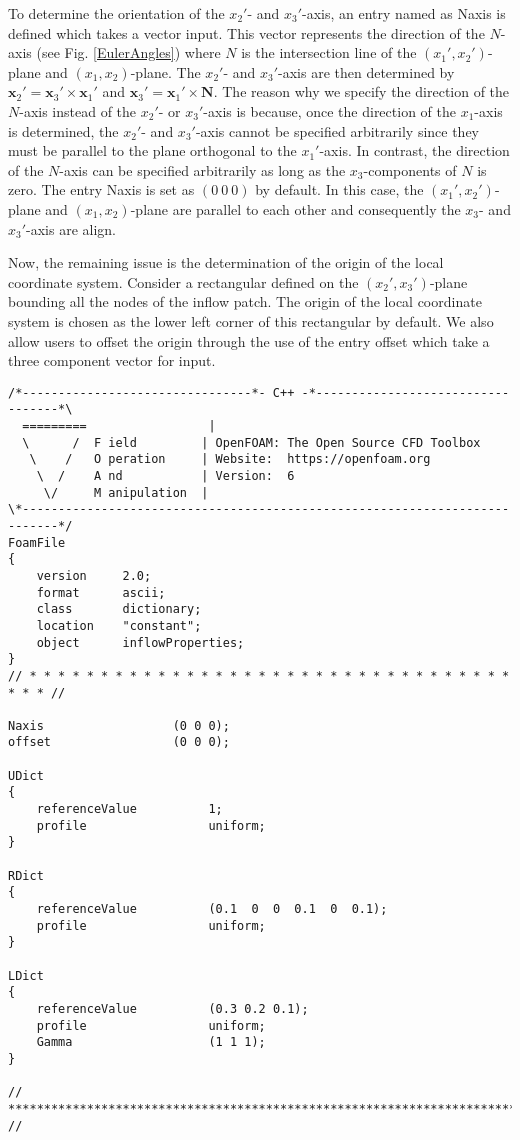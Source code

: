 To determine the orientation of the $x_2'$- and $x_3'$-axis, an entry named as \textcolor{mauve}{Naxis} is defined which takes a vector input. This vector represents the direction of the $N$-axis (see Fig. \ref{EulerAngles}) where $N$ is the intersection line of the $(x_1',x_2')$-plane and $(x_1,x_2)$-plane. The $x_2'$- and $x_3'$-axis are then determined by $\boldsymbol{x}_2' = \boldsymbol{x}_3'\times\boldsymbol{x}_1'$ and $\boldsymbol{x}_3' = \boldsymbol{x}_1'\times\boldsymbol{N}$. The reason why we specify the direction of the $N$-axis instead of the $x_2'$- or $x_3'$-axis is because, once the direction of the $x_1$-axis is determined, the $x_2'$- and $x_3'$-axis cannot be specified arbitrarily since they must be parallel to the plane orthogonal to the $x_1'$-axis. In contrast, the direction of the $N$-axis can be specified arbitrarily as long as the $x_3$-components of $N$ is zero. The entry \textcolor{mauve}{Naxis} is set as $(0 \ 0 \ 0)$ by default. In this case, the $(x_1',x_2')$-plane and $(x_1,x_2)$-plane are parallel to each other and consequently the $x_3$- and $x_3'$-axis are align.

Now, the remaining issue is the determination of the origin of the local coordinate system. Consider a rectangular defined on the $(x_2',x_3')$-plane bounding all the nodes of the inflow patch. The origin of the local coordinate system is chosen as the lower left corner of this rectangular by default. We also allow users to offset the origin through the use of the entry \textcolor{mauve}{offset} which take a three component vector for input. 

\begin{lstlisting}
/*--------------------------------*- C++ -*----------------------------------*\
  =========                 |
  \      /  F ield         | OpenFOAM: The Open Source CFD Toolbox
   \    /   O peration     | Website:  https://openfoam.org
    \  /    A nd           | Version:  6
     \/     M anipulation  |
\*---------------------------------------------------------------------------*/
FoamFile
{
    version     2.0;
    format      ascii;
    class       dictionary;
    location    "constant";
    object      inflowProperties;
}
// * * * * * * * * * * * * * * * * * * * * * * * * * * * * * * * * * * * * * //

Naxis                  (0 0 0);
offset                 (0 0 0);

UDict
{
    referenceValue          1;
    profile                 uniform;
}

RDict
{
    referenceValue          (0.1  0  0  0.1  0  0.1);
    profile                 uniform;
}

LDict
{
    referenceValue          (0.3 0.2 0.1);
    profile                 uniform;
    Gamma                   (1 1 1);
}

// ************************************************************************* //
\end{lstlisting}


